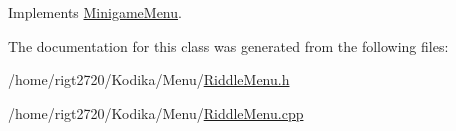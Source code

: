Implements \hyperlink{classMinigameMenu_abde3ae319bf1660a8626c6f765e054a8}{Minigame\-Menu}.



The documentation for this class was generated from the following files\-:\begin{DoxyCompactItemize}
\item 
/home/rigt2720/\-Kodika/\-Menu/\hyperlink{RiddleMenu_8h}{Riddle\-Menu.\-h}\item 
/home/rigt2720/\-Kodika/\-Menu/\hyperlink{RiddleMenu_8cpp}{Riddle\-Menu.\-cpp}\end{DoxyCompactItemize}
